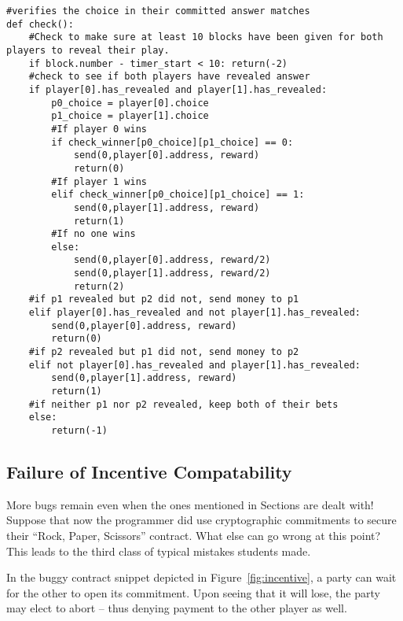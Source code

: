 \documentclass[10pt,twocolumn,letterpaper]{article}
\newcommand{\elaine}[1]{{\color{red}{[elaine: #1]}}}
\begin{document}
\begin{mdframed}
\begin{verbatim}
#verifies the choice in their committed answer matches
def check():
	#Check to make sure at least 10 blocks have been given for both players to reveal their play.
	if block.number - timer_start < 10: return(-2)
	#check to see if both players have revealed answer
	if player[0].has_revealed and player[1].has_revealed:
		p0_choice = player[0].choice
		p1_choice = player[1].choice
		#If player 0 wins
		if check_winner[p0_choice][p1_choice] == 0:
			send(0,player[0].address, reward)
			return(0)
		#If player 1 wins
		elif check_winner[p0_choice][p1_choice] == 1:
			send(0,player[1].address, reward)
			return(1)
		#If no one wins
		else:
			send(0,player[0].address, reward/2)
			send(0,player[1].address, reward/2)
			return(2)
	#if p1 revealed but p2 did not, send money to p1
	elif player[0].has_revealed and not player[1].has_revealed:
		send(0,player[0].address, reward)
		return(0)
	#if p2 revealed but p1 did not, send money to p2
	elif not player[0].has_revealed and player[1].has_revealed:
		send(0,player[1].address, reward)
		return(1)
	#if neither p1 nor p2 revealed, keep both of their bets
	else:
		return(-1)
\end{verbatim}
\end{mdframed}

\subsection{Failure of Incentive Compatability}
More bugs remain even when the ones mentioned in Sections \elaine{refer}
are dealt with!
Suppose that now the programmer
did use cryptographic commitments to secure their 
``Rock, Paper, Scissors'' contract. 
What else can go wrong at this point?
This leads to the third class of typical mistakes
students made.

In the buggy contract snippet depicted 
in Figure~\ref{fig:incentive}, a party can 
wait for the other to open its commitment. Upon
seeing that it will lose, the party may elect
to abort -- thus denying payment
to the other player as well. 
\end{document}
